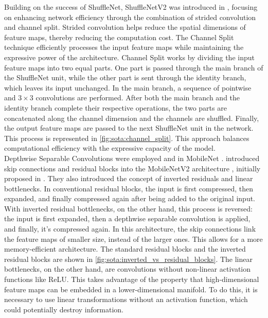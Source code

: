 Building on the success of ShuffleNet, ShuffleNetV2 was introduced in
\cite{MaShuffleNetV2}, focusing on enhancing network efficiency through the
combination of strided convolution and channel split. Strided convolution helps
reduce the spatial dimensions of feature maps, thereby reducing the computation
cost. The Channel Split technique efficiently processes the input feature maps
while maintaining the expressive power of the architecture. Channel Split works
by dividing the input feature maps into two equal parts. One part is passed
through the main branch of the ShuffleNet unit, while the other part is sent
through the identity branch, which leaves its input unchanged. In the main
branch, a sequence of pointwise and $3\times 3$ convolutions are performed.
After both the main branch and the identity branch complete their respective
operations, the two parts are concatenated along the channel dimension and the
channels are shuffled. Finally, the output feature maps are passed to the next
ShuffleNet unit in the network. This process is represented in
\cref{fig:sota:channel_split}. This approach balances computational efficiency
with the expressive capacity of the model.\\

Depthwise Separable Convolutions were employed and in MobileNet
\cite{howard2017mobilenets}. \citeauthor{DBLP:conf/cvpr/SandlerHZZC18}
introduced skip connections and residual blocks into the MobileNetV2
architecture \cite{DBLP:conf/cvpr/SandlerHZZC18}, initially proposed in
\cite{DBLP:conf/cvpr/HeZRS16}. They also introduced the concept of inverted
residuals and linear bottlenecks. In conventional residual blocks, the input is
first compressed, then expanded, and finally compressed again after being added
to the original input. With inverted residual bottlenecks, on the other hand,
this process is reversed: the input is first expanded, then a depthwise
separable convolution is applied, and finally, it's compressed again. In this
architecture, the skip connections link the feature maps of smaller size,
instead of the larger ones. This allows for a more memory-efficient
architecture. The standard residual blocks and the inverted residual blocks are
shown in \cref{fig:sota:inverted_vs_residual_blocks}. The linear bottlenecks, on
the other hand, are convolutions without non-linear activation functions like
\ac{ReLU}. This takes advantage of the property that high-dimensional feature
maps can be embedded in a lower-dimensional manifold. To do this, it is
necessary to use linear transformations without an activation function, which
could potentially destroy information.\\

